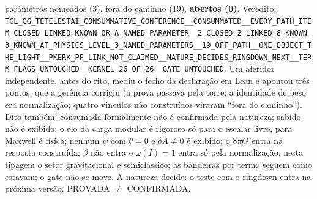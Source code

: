 \documentclass[11pt]{article}
\theoremstyle{definition}\newtheorem{deriv}{Derivação}
\begin{document}
parâmetros nomeados (3), fora do caminho (19), \textbf{abertos (0)}. Veredito: \texttt{TGL\_QG\_TETELESTAI\_CONSUMMATIVE\_CONFERENCE\_\_CONSUMMATED\_\_EVERY\_PATH\_ITEM\_CLOSED\_LINKED\_KNOWN\_OR\_A\_NAMED\_PARAMETER\_\_2\_CLOSED\_2\_LINKED\_8\_KNOWN\_3\_KNOWN\_AT\_PHYSICS\_LEVEL\_3\_NAMED\_PARAMETERS\_\_19\_OFF\_PATH\_\_ONE\_OBJECT\_THE\_LIGHT\_\_PKERK\_PF\_LINK\_NOT\_CLAIMED\_\_NATURE\_DECIDES\_RINGDOWN\_NEXT\_\_TERM\_FLAGS\_UNTOUCHED\_\_KERNEL\_26\_OF\_26\_\_GATE\_UNTOUCHED}. Um aferidor independente, antes do rito, mediu o fecho da declaração em Lean e apontou três pontos, que a gerência corrigiu (a prova passava pela torre; a identidade de peso era normalização; quatro vínculos não construídos viraram ``fora do caminho''). Dito também: consumada formalmente não é confirmada pela natureza; sabido não é exibido; o elo da carga modular é rigoroso só para o escalar livre, para Maxwell é física; nenhum $\psi$ com $\theta=0$ e $\delta A\neq0$ é exibido; o $8\pi G$ entra na resposta construída; $\beta$ não entra e $\omega(I)=1$ entra só pela normalização; nesta tipagem o setor gravitacional é semiclássico; as bandeiras por termo seguem como estavam; o gate não se move. A natureza decide: o teste com o ringdown entra na próxima versão. PROVADA $\neq$ CONFIRMADA.
\end{document}
